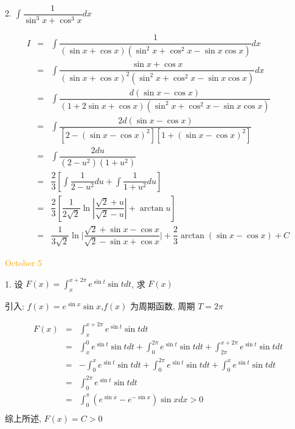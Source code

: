 2. $\displaystyle{\int\dfrac{1}{\sin^{3} x+\cos^{3} x}dx}$

\begin{solution}  
	\begin{eqnarray*}
		I & = & \int \dfrac{1}{(\sin x+\cos x)(\sin^2 x+\cos^2 x-\sin x\cos x)}dx\\
		  & = & \int \dfrac{\sin x+\cos x}{(\sin x+\cos x)^{2}(\sin^2 x+\cos^2 x-\sin x\cos x)}dx\\
		  & = & \int \dfrac{d(\sin x-\cos x)}{(1+2\sin x+\cos x)(\sin^2 x+\cos^2 x-\sin x\cos x)}\\
		  & = & \int \dfrac{2d(\sin x-\cos x)}{\left[2-(\sin x-\cos x)^2\right]\left[1+(\sin x-\cos x)^2\right]}\\
		  & = & \int \dfrac{2du}{(2-u^2)(1+u^2)}\\
		  & = & \dfrac{2}{3}\left[\int\dfrac{1}{2-u^2}du+\int\dfrac{1}{1+u^2}du\right]\\
		  & = & \dfrac{2}{3}\left[\dfrac{1}{2\sqrt{2}}\ln|\dfrac{\sqrt{2}+u}{\sqrt{2}-u}|+\arctan u\right]\\
		  & = & \dfrac{1}{3\sqrt{2}}\ln\big|\dfrac{\sqrt{2}+\sin x-\cos x}{\sqrt{2}-\sin x+\cos x}\big|+\dfrac{2}{3}\arctan(\sin x-\cos x)+C
	\end{eqnarray*}
\end{solution}


\textcolor{orange}{October 5}

1. 设 $\displaystyle{F(x)=\int_{x}^{x+2\pi}e^{\sin t}\sin tdt}$, 求 $F(x)$

\begin{solution}

	引入: $f(x)=e^{\sin x}\sin x$,$f(x)$ 为周期函数, 周期 $T = 2\pi$

	\begin{eqnarray*}
		F(x) & = & \int_{x}^{x+2\pi}e^{\sin t}\sin tdt\\
		     & = & \int_{x}^{0}e^{\sin t}\sin tdt + \int_{0}^{2\pi}e^{\sin t}\sin tdt + \int_{2\pi}^{x+2\pi}e^{\sin t}\sin tdt\\
		     & = & -\int_{0}^{x}e^{\sin t}\sin tdt + \int_{0}^{2\pi}e^{\sin t}\sin tdt + \int_{0}^{x}e^{\sin t}\sin tdt\\
		     & = & \int_{0}^{2\pi}e^{\sin t}\sin tdt\\
		     & = & \int_{0}^{\pi}(e^{\sin x}-e^{-\sin x})\sin xdx>0\\
	\end{eqnarray*}
	综上所述, $F(x)=C>0$
\end{solution}


